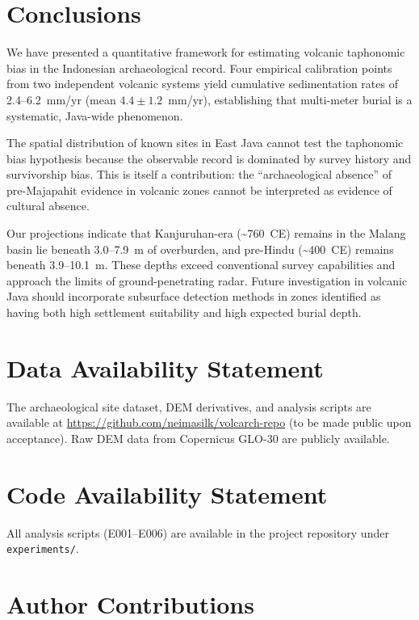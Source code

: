 \documentclass[12pt,a4paper]{article}
\begin{document}
\section{Conclusions}

We have presented a quantitative framework for estimating volcanic taphonomic bias in the Indonesian archaeological record. Four empirical calibration points from two independent volcanic systems yield cumulative sedimentation rates of 2.4--6.2~mm/yr (mean $4.4 \pm 1.2$~mm/yr), establishing that multi-meter burial is a systematic, Java-wide phenomenon.

The spatial distribution of known sites in East Java cannot test the taphonomic bias hypothesis because the observable record is dominated by survey history and survivorship bias. This is itself a contribution: the ``archaeological absence'' of pre-Majapahit evidence in volcanic zones cannot be interpreted as evidence of cultural absence.

Our projections indicate that Kanjuruhan-era (\textasciitilde760~CE) remains in the Malang basin lie beneath 3.0--7.9~m of overburden, and pre-Hindu (\textasciitilde400~CE) remains beneath 3.9--10.1~m. These depths exceed conventional survey capabilities and approach the limits of ground-penetrating radar. Future investigation in volcanic Java should incorporate subsurface detection methods in zones identified as having both high settlement suitability and high expected burial depth.

\section*{Data Availability Statement}

The archaeological site dataset, DEM derivatives, and analysis scripts are available at \url{https://github.com/neimasilk/volcarch-repo} (to be made public upon acceptance). Raw DEM data from Copernicus GLO-30 are publicly available.

\section*{Code Availability Statement}

All analysis scripts (E001--E006) are available in the project repository under \texttt{experiments/}.

\section*{Author Contributions}
\end{document}
